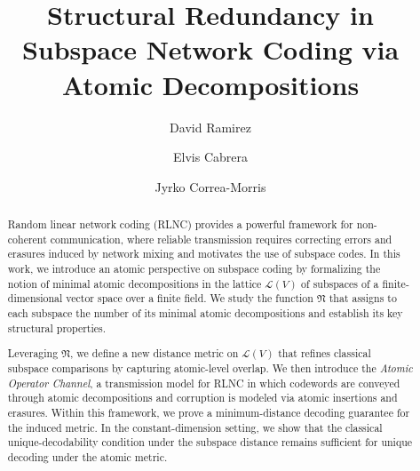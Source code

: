 \documentclass{svproc}
\begin{document}
\mainmatter  

\title{Structural Redundancy in Subspace Network Coding via Atomic Decompositions}

\author{%
David Ramirez \and
Elvis Cabrera \and
Jyrko Correa-Morris
}



\maketitle

\begin{abstract}
Random linear network coding (RLNC) provides a powerful framework for non-coherent communication, where reliable transmission requires correcting errors and erasures induced by network mixing and motivates the use of subspace codes. In this work, we introduce an atomic perspective on subspace coding by formalizing the notion of minimal atomic decompositions in the lattice $\mathcal{L}(V)$ of subspaces of a finite-dimensional vector space over a finite field. We study the function $\mathfrak{N}$ that assigns to each subspace the number of its minimal atomic decompositions and establish its key structural properties.

Leveraging $\mathfrak{N}$, we define a new distance metric on $\mathcal{L}(V)$ that refines classical subspace comparisons by capturing atomic-level overlap. We then introduce the \emph{Atomic Operator Channel}, a transmission model for RLNC in which codewords are conveyed through atomic decompositions and corruption is modeled via atomic insertions and erasures. Within this framework, we prove a minimum-distance decoding guarantee for the induced metric. In the constant-dimension setting, we show that the classical unique-decodability condition under the subspace distance remains sufficient for unique decoding under the atomic metric.

\end{abstract}
\end{document}
